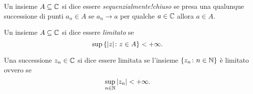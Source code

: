\begin{definition}
Un insieme $A\subseteq {\mathbb C}$ si dice
essere \emph{sequenzialmente!chiuso}%
%
%
se presa una qualunque successione
di punti $a_n\in A$ se $a_n \to a$ per qualche $a\in {\mathbb C}$
allora $a\in A$.
\end{definition}

\begin{definition}[limitatezza]
Un insieme $A\subseteq {\mathbb C}$ si dice essere \emph{limitato}%
%
se
\[
  \sup {\left\{  {\left|z\right|}\colon z \in A \right\}} < +\infty.
\]

Una successione $z_n\in {\mathbb C}$ si dice essere limitata se l'insieme
${\left\{ z_n\colon n\in {\mathbb N} \right\}}$ è limitato ovvero se
\[
  \sup_{n\in {\mathbb N}} {\left|z_n\right|} < +\infty.
\]
\end{definition}

\begin{comment} 
\begin{definition}[disco]
Dato $R\ge 0$ si può definire il disco complesso di raggio $R$ come
l'insieme $D_R\subset \CC$ definito da
\[
  D_R = \ENCLOSE{z\in \CC\colon \abs{z} \le R}.
\]
Geometricamente si tratta di un cerchio pieno di raggio $R$ centrato in $0$.
\end{definition}

\begin{theorem}[il disco è chiuso e limitato]
Per ogni $R\in [0,+\infty)$ il disco $D_R$ è un sottoinsieme di $C$ non vuoto, chiuso e limitato.
\end{theorem}
%
\begin{proof}
Per ogni $R\ge 0$ si ha $0\in D_R$ e quindi $D_R$ non è mai vuoto.

Che $D_R$ sia limitato è pure ovvio,
in quanto dato $z\in D_R$ si ha per
definizione $\abs{z}\le R$ e dunque $\sup_{z\in D_R} \abs{z} = R < +\infty$.

Per dimostrare che $D_R$ è chiuso consideriamo una qualunque successione $a_n \in D_R$. Sappiamo dunque che $\abs{a_n} \le R$
cioè $R-\abs{a_n} \ge 0$ per ogni $n\in \NN$.
Per la continuità del modulo sappiamo che $R-\abs{a_n}\to R-\abs{a}$
e per il teorema della permanenza del segno possiamo concludere che $R-\abs{a}\ge 0$ cioè che $\abs{a}\le R$ ovvero $a \in D_R$. Come volevamo dimostrare.
\end{proof}
\end{comment}

